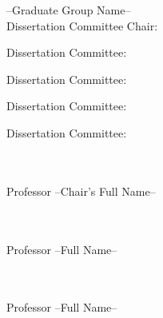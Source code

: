 \begin{multicols}{2}

\begin{flushleft}
\large

--Graduate Group Name-- \\Dissertation Committee Chair:\\
\phantom{Reading}



\vspace{1cm}

Dissertation Committee:\\
\phantom{Chair}

\vspace{1cm}

Dissertation Committee:\\
\phantom{Research Advisor's Name}

\vspace{1cm}

Dissertation Committee:\\
\phantom{Research Advisor's Name}

\vspace{1cm}

Dissertation Committee:\\
\phantom{Research Advisor's Name}


\end{flushleft}

\columnbreak

\begin{flushright}
\large

\vspace*{.05cm}

\quad  \\[-.35cm]
\underline{\phantom{\hspace{7cm}}} \\ 
Professor --Chair's Full Name--

\vspace{1cm}

\quad \\[-.35cm]
\underline{\phantom{\hspace{7cm}}} \\
Professor --Full Name--

\vspace{.9cm}

\quad  \\[-.35cm]
\underline{\phantom{\hspace{7cm}}} \\
Professor --Full Name--


\end{flushright}
\end{multicols}

